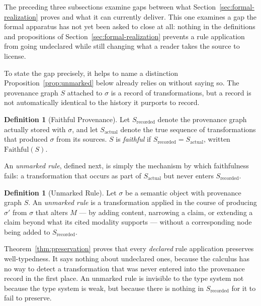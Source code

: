 \documentclass[11pt]{article}
\theoremstyle{definition}
\newtheorem{definition}[theorem]{Definition}
\begin{document}
The preceding three subsections examine gaps between what Section~\ref{sec:formal-realization} proves and what it can currently deliver. This one examines a gap the formal apparatus has not yet been asked to close at all: nothing in the definitions and propositions of Section~\ref{sec:formal-realization} prevents a rule application from going undeclared while still changing what a reader takes the source to license.

To state the gap precisely, it helps to name a distinction Proposition~\ref{prop:unmarked} below already relies on without saying so. The provenance graph $S$ attached to $\sigma$ is a record of transformations, but a record is not automatically identical to the history it purports to record.

\begin{definition}[Faithful Provenance]
\label{def:faithful-provenance}
Let $S_{\mathrm{recorded}}$ denote the provenance graph actually stored with $\sigma$, and let $S_{\mathrm{actual}}$ denote the true sequence of transformations that produced $\sigma$ from its sources. $S$ is \emph{faithful} if $S_{\mathrm{recorded}} = S_{\mathrm{actual}}$, written $\mathrm{Faithful}(S)$.
\end{definition}

An \emph{unmarked rule}, defined next, is simply the mechanism by which faithfulness fails: a transformation that occurs as part of $S_{\mathrm{actual}}$ but never enters $S_{\mathrm{recorded}}$.

\begin{definition}[Unmarked Rule]
\label{def:unmarked-rule}
Let $\sigma$ be a semantic object with provenance graph $S$. An \emph{unmarked rule} is a transformation applied in the course of producing $\sigma'$ from $\sigma$ that alters $M$ --- by adding content, narrowing a claim, or extending a claim beyond what its cited modality supports --- without a corresponding node being added to $S_{\mathrm{recorded}}$.
\end{definition}

Theorem~\ref{thm:preservation} proves that every \emph{declared} rule application preserves well-typedness. It says nothing about undeclared ones, because the calculus has no way to detect a transformation that was never entered into the provenance record in the first place. An unmarked rule is invisible to the type system not because the type system is weak, but because there is nothing in $S_{\mathrm{recorded}}$ for it to fail to preserve.
\end{document}
